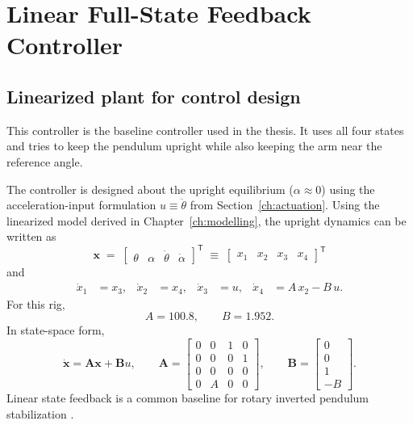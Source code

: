 \section{Linear Full-State Feedback Controller}
\label{ch:lin}

\subsection{Linearized plant for control design}
This controller is the baseline controller used in the thesis. It uses all four states and tries to keep the pendulum upright while also keeping the arm near the reference angle.

The controller is designed about the upright equilibrium ($\alpha \approx 0$) using the acceleration-input formulation $u \equiv \ddot{\theta}$ from Section~\ref{ch:actuation}. Using the linearized model derived in Chapter~\ref{ch:modelling}, the upright dynamics can be written as
\[
\mathbf{x} \;=\; \begin{bmatrix}\theta & \alpha & \dot{\theta} & \dot{\alpha}\end{bmatrix}^{\mathsf{T}}
\;\equiv\; \begin{bmatrix}x_1 & x_2 & x_3 & x_4\end{bmatrix}^{\mathsf{T}}
\]
and
\begin{align}
\dot{x}_1 &= x_3, &
\dot{x}_2 &= x_4, &
\dot{x}_3 &= u, &
\dot{x}_4 &= A\,x_2 - B\,u.
\label{eq:lin_plant}
\end{align}
For this rig,
\[
A = 100.8,\qquad B = 1.952.
\]
In state-space form,
\[
\dot{\mathbf{x}} = \mathbf{A}\mathbf{x} + \mathbf{B}u,\qquad
\mathbf{A}=
\begin{bmatrix}
0&0&1&0\\
0&0&0&1\\
0&0&0&0\\
0&A&0&0
\end{bmatrix},\qquad
\mathbf{B}=
\begin{bmatrix}
0\\0\\1\\-B
\end{bmatrix}.
\]
Linear state feedback is a common baseline for rotary inverted pendulum stabilization \cite{Park2011,Chawla2018}.

